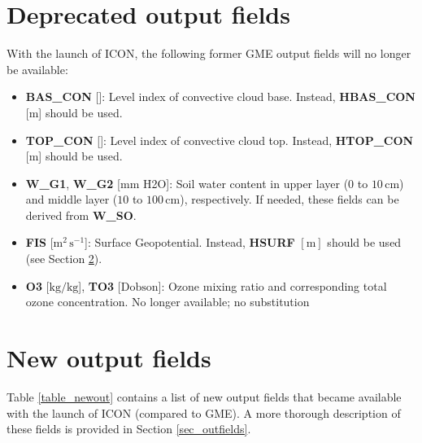 \section{Deprecated output fields}
With the launch of ICON, the following former GME output fields will no longer be available:

\begin{itemize}
 \item \textbf{BAS\_CON} [\textendash]: Level index of convective cloud base. Instead, \textbf{HBAS\_CON} [m] should be used.
 \item \textbf{TOP\_CON} [\textendash]: Level index of convective cloud top. Instead, \textbf{HTOP\_CON} [m] should be used.
 \item \textbf{W\_G1}, \textbf{W\_G2}  [mm H2O]: Soil water content in upper layer ($0$ to $10\,\mathrm{cm}$) and middle layer ($10$ to $100\,\mathrm{cm}$), respectively. 
                                                 If needed, these fields can be derived from \textbf{W\_SO}.
 \item \textbf{FIS} [$\mathrm{m^{2}\,s^{-1}}$]: Surface Geopotential. Instead, \textbf{HSURF} $[\mathrm{m}]$ should be used (see Section \ref{sec_newout}).
 \item \textbf{O3} [$\mathrm{kg/kg}$], \textbf{TO3} [$\mathrm{Dobson}$]: Ozone mixing ratio and corresponding total ozone concentration. No longer available; no substitution
\end{itemize}



\section{New output fields}\label{sec_newout}

Table \ref{table_newout} contains a list of new output fields that became available with the launch of ICON (compared to GME). A more thorough description of these 
fields is provided in Section \ref{sec_outfields}.

